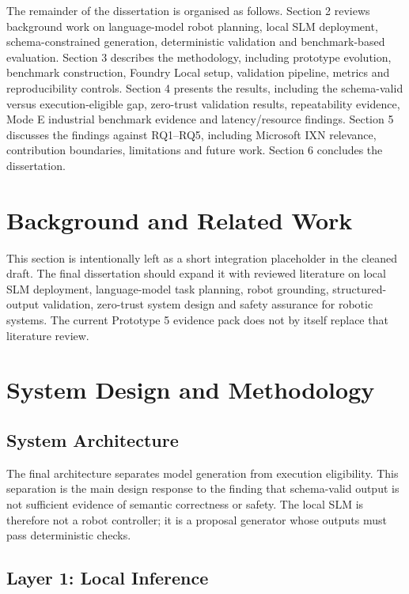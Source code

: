 \documentclass[sigconf,nonacm]{acmart}
\begin{document}
The remainder of the dissertation is organised as follows. Section 2 reviews background work on language-model robot planning, local SLM deployment, schema-constrained generation, deterministic validation and benchmark-based evaluation. Section 3 describes the methodology, including prototype evolution, benchmark construction, Foundry Local setup, validation pipeline, metrics and reproducibility controls. Section 4 presents the results, including the schema-valid versus execution-eligible gap, zero-trust validation results, repeatability evidence, Mode E industrial benchmark evidence and latency/resource findings. Section 5 discusses the findings against RQ1--RQ5, including Microsoft IXN relevance, contribution boundaries, limitations and future work. Section 6 concludes the dissertation.

\section{Background and Related Work}

This section is intentionally left as a short integration placeholder in the cleaned draft. The final dissertation should expand it with reviewed literature on local SLM deployment, language-model task planning, robot grounding, structured-output validation, zero-trust system design and safety assurance for robotic systems. The current Prototype 5 evidence pack does not by itself replace that literature review.

\section{System Design and Methodology}

\subsection{System Architecture}
\label{sec:system_architecture}

The final architecture separates model generation from execution eligibility. This separation is the main design response to the finding that schema-valid output is not sufficient evidence of semantic correctness or safety. The local SLM is therefore not a robot controller; it is a proposal generator whose outputs must pass deterministic checks.

\subsection{Layer 1: Local Inference}
\end{document}
